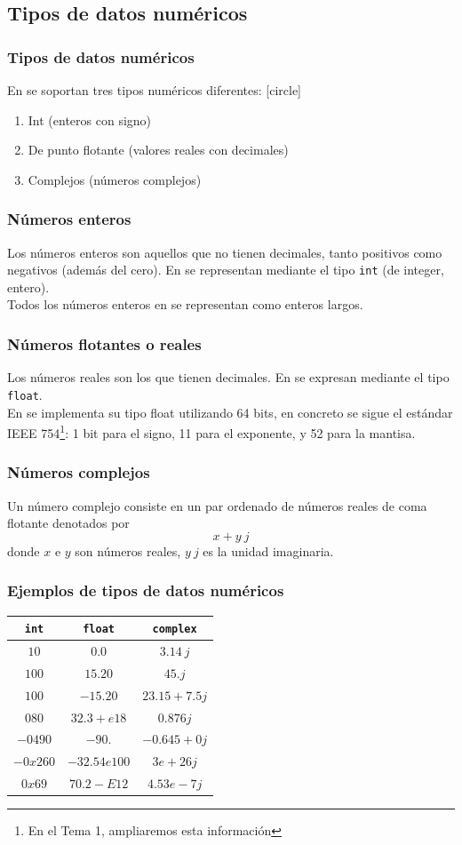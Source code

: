 \documentclass[12pt]{beamer}
\begin{document}
{\subsection{Tipos de datos numéricos}
\begin{frame}
\frametitle{Tipos de datos numéricos}
En \python{} se soportan tres tipos numéricos diferentes:
[circle]
\begin{enumerate}[<+->]
\item Int (enteros con signo)
\item De punto flotante (valores reales con decimales)
\item Complejos (números complejos)
\end{enumerate}
\end{frame}
\begin{frame}
\frametitle{Números enteros}
Los números enteros son aquellos que no tienen decimales, tanto positivos como negativos (además del cero). En \python{} se representan mediante el tipo \texttt{int} (de integer, entero).
\\
\bigskip
Todos los números enteros en  se representan como enteros largos.
\end{frame}
\begin{frame}
\frametitle{Números flotantes o reales}
Los números reales son los que tienen decimales. En \python{} se expresan mediante el tipo \texttt{float}.
\\
\bigskip
En \python{} se implementa su tipo float utilizando 64 bits, en concreto se sigue el estándar IEEE 754\footnote{En el Tema 1, ampliaremos esta información}: 1 bit para el signo, 11 para el exponente, y 52 para la mantisa.
\end{frame}
\begin{frame}
\frametitle{Números complejos}
Un número complejo consiste en un par ordenado de números reales de coma flotante denotados por
\[ x + y \: j\]
donde $x$ e $y$ son números reales, $y \: j$ es la unidad imaginaria.
\end{frame}
\begin{frame}
\frametitle{Ejemplos de tipos de datos numéricos}
\begin{table}
\begin{tabular}{| c | c | c |}
\hline
\texttt{int} & \texttt{float} & \texttt{complex} \\ \hline
$10$ & $0.0$ & $3.14 \: j$ \\ \hline
$100$ & $15.20$ & $45.j$ \\ \hline
$100$ & $-15.20$ & $23.15+7.5j$ \\ \hline
$080$ & $32.3+e18$ & $0.876j$ \\ \hline
$-0490$ & $-90.$ & $-0.645+0j$ \\ \hline
$-0x260$ & $-32.54e100$ & $3e+26j$ \\ \hline
$0x69$ & $70.2-E12$ & $4.53e-7j$ \\ \hline
\end{tabular}
\end{table}    
\end{frame}
}
\end{document}
